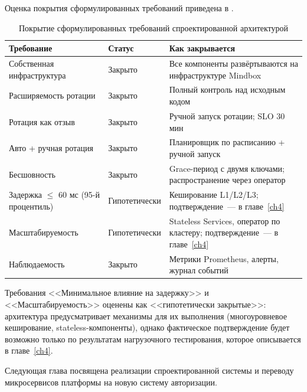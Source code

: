 Оценка покрытия сформулированных требований
приведена в .

\begin{table}[h]
  \centering
  \caption{Покрытие сформулированных требований спроектированной архитектурой}
  \label{tab:requirements-coverage}
  \begin{tabularx}{\textwidth}{X l X}
    \hline
    \textbf{Требование} & \textbf{Статус} & \textbf{Как закрывается} \\
    \hline
    Собственная инфраструктура & Закрыто &
      Все компоненты развёртываются на инфраструктуре Mindbox \\
    Расширяемость ротации & Закрыто &
      Полный контроль над исходным кодом \\
    Ротация как отзыв & Закрыто &
      Ручной запуск ротации; SLO 30 мин \\
    Авто + ручная ротация & Закрыто &
      Планировщик по расписанию + ручной запуск \\
    Бесшовность & Закрыто &
      Grace-период с двумя ключами; распространение через оператор \\
    Задержка $\leq$ 60 мс (95-й процентиль) & Гипотетически &
      Кеширование L1/L2/L3; подтверждение~--- в главе~\ref{ch4} \\
    Масштабируемость & Гипотетически &
      Stateless Services, оператор по кластеру; подтверждение~--- в главе~\ref{ch4} \\
    Наблюдаемость & Закрыто &
      Метрики Prometheus, алерты, журнал событий \\
    \hline
  \end{tabularx}
\end{table}

Требования <<Минимальное влияние на задержку>>
и <<Масштабируемость>> оценены как <<гипотетически закрытые>>:
архитектура предусматривает механизмы для их выполнения
(многоуровневое кеширование, stateless-компоненты),
однако фактическое подтверждение будет возможно только
по результатам нагрузочного тестирования,
которое описывается в главе~\ref{ch4}.

Следующая глава посвящена реализации спроектированной системы
и переводу микросервисов платформы на новую систему авторизации.
